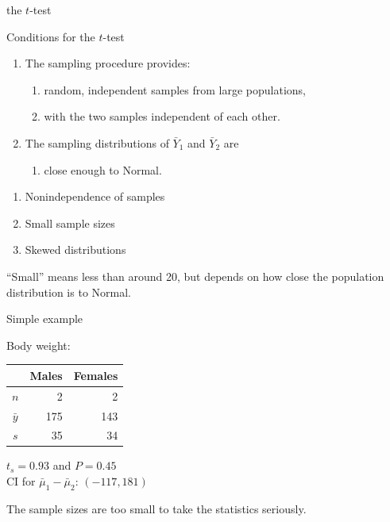 \begin{frame}{the $t$-test}

  \begin{block}{Conditions for the $t$-test}
    \begin{enumerate}
      \item The sampling procedure provides:
        \begin{enumerate}
          \item random, independent samples from large populations,
          \item with the two samples independent of each other.
        \end{enumerate}
      \item The sampling distributions of $\bar Y_1$ and $\bar Y_2$ are
        \begin{enumerate}
          \item close enough to Normal.
      \end{enumerate}
    \end{enumerate}
  \end{block}

  \vspace{2em}

  \begin{enumerate}
    \item Nonindependence of samples
    \item Small sample sizes 
    \item Skewed distributions
  \end{enumerate}

  \vspace{2em}

  ``Small'' means less than around 20,
  but depends on how close the population distribution is to Normal.

\end{frame}

\begin{frame}{Simple example}


  \vspace{2em}


  Body weight:
  \begin{center}
    \begin{tabular}{crr}
       & Males & Females \\
       \hline
       $n$ & 2 & 2 \\
       $\bar y$ & 175 & 143 \\
       $s$ & 35 & 34
     \end{tabular}

   \vspace{2em}

   {$t_s=0.93$ and $P=0.45$}\\
   CI for $\bar \mu_1 - \bar \mu_2$: $(-117,181)$
   \end{center}

   \vspace{2em}
  
   \pause
   \alert{The sample sizes are too small} to take the statistics seriously.
   
\end{frame}


